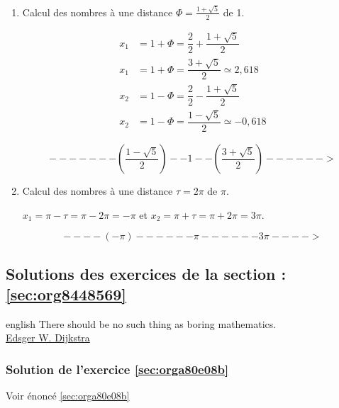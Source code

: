 \documentclass[a4paper, 11pt, twoside]{article}
\begin{document}
\begin{enumerate}
\item Calcul des nombres à une distance \(\Phi = \frac{1 +
       \sqrt{5}}{2}\) de 1. 

\begin{align*}
x_1 &= 1 + \Phi = \dfrac{2}{2} + \dfrac{1 + \sqrt{5}}{2} \\
x_1 &= 1 + \Phi = \dfrac{3 + \sqrt{5}}{2}\simeq 2,618 \\
x_2 &= 1 - \Phi = \dfrac{2}{2} - \dfrac{1 + \sqrt{5}}{2} \\
x_2 &= 1 - \Phi = \dfrac{1 - \sqrt{5}}{2}\simeq -0,618 
\end{align*}

\[-------\left(\dfrac{1 - \sqrt{5}}{2}\right)--1--\left(\dfrac{3 + \sqrt{5}}{2}\right)------>\]

\item Calcul des nombres à une distance \(\tau = 2\pi\) de \(\pi\).

\(x_1 = \pi - \tau = \pi - 2\pi = -\pi\) et \(x_2 = \pi + \tau =
       \pi + 2\pi = 3\pi\).

\[----(-\pi)------\pi------3\pi---->\]
\end{enumerate}
\stopcontents[level-2]

\subsection{Solutions des exercices de la section : \ref{sec:org8448569}}
\label{sec:orgfa2afb0}

\begin{foreigndisplayquote}{english}
There should be no such thing as boring mathematics.\\

\href{https://en.wikipedia.org/wiki/Edsger\_W.\_Dijkstra}{Edsger W. Dijkstra}
\end{foreigndisplayquote}

\startcontents[level-2]

\subsubsection{Solution de l'exercice \ref{sec:orga80e08b}}
\label{sec:org3e8cc0d}
Voir énoncé \ref{sec:orga80e08b}
\end{document}
